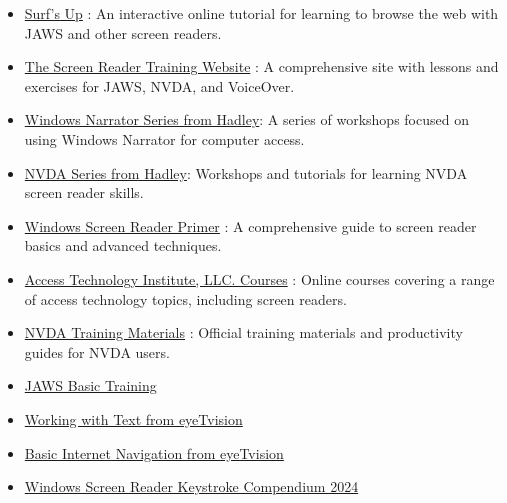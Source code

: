 \begin{itemize}
 \item \href{https://www.freedomscientific.com/SurfsUp/}{Surf's Up} \cite{SurfsUp,SurfsUpOffline}: An interactive online tutorial for learning to browse the web with JAWS and other screen readers.
 \item \href{https://srt.csb-cde.ca.gov/}{The Screen Reader Training Website} \cite{SRTUpdate}: A comprehensive site with lessons and exercises for JAWS, NVDA, and VoiceOver.
 \item \href{https://hadley.edu/workshops/windows-narrator-series}{Windows Narrator Series from Hadley}: A series of workshops focused on using Windows Narrator for computer access.
 \item \href{https://hadley.edu/workshops/nvda-screen-reader-series}{NVDA Series from Hadley}: Workshops and tutorials for learning NVDA screen reader skills.
 \item \href{https://carroll.org/the-windows-screen-reader-primer-all-the-basics-and-more-second-edition/}{Windows Screen Reader Primer} \cite{WSRPrimer2ndEd,WSRPrimerCoverage}: A comprehensive guide to screen reader basics and advanced techniques.
 \item \href{https://www.blind.training/}{Access Technology Institute, LLC. Courses} \cite{ATITraining}: Online courses covering a range of access technology topics, including screen readers.
 \item \href{https://www.nvaccess.org/product/nvda-productivity-bundle/}{NVDA Training Materials} \cite{NVDATraining}: Official training materials and productivity guides for NVDA users.
 \item \href{https://support.freedomscientific.com/Training/JAWS-Basic-Training.zip}{JAWS Basic Training}
 \item \href{https://eyetvision.org/screen-reader-curriculum-landing-page/\#wwt2}{Working with Text from eyeTvision} \cite{EyetvisionWWT}
 \item \href{https://eyetvision.org/screen-reader-curriculum-landing-page/\#bin2}{Basic Internet Navigation from eyeTvision} \cite{EyetvisionBIN}
 \item \href{https://shop.nbp.org/products/windows-screen-reader-keystroke-compendium-2024-update}{Windows Screen Reader Keystroke Compendium 2024} \cite{WSRKeystrokeCompendium}
\end{itemize}

